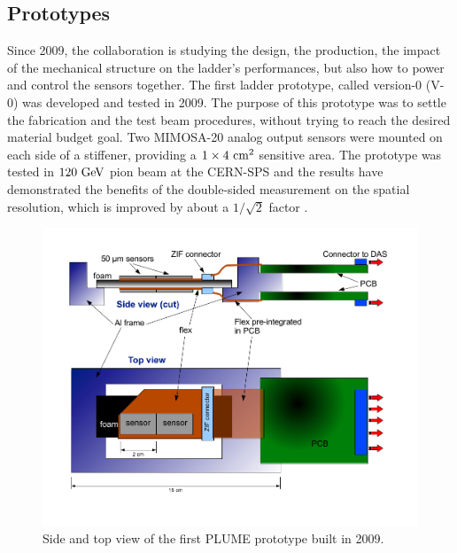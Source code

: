     \subsection{Prototypes}
    \label{sec:prototypes}

    Since 2009, the collaboration is studying the design, the production, the impact of the mechanical structure on the ladder's performances, but also how to power and control the sensors together.
    The first ladder prototype, called version-0 (V-0) was developed and tested in 2009.
    The purpose of this prototype was to settle the fabrication and the test beam procedures, without trying to reach the desired material budget goal.
    Two MIMOSA-20 analog output sensors were mounted on each side of a stiffener, providing a $1 \times 4~\rm{cm}^2$ sensitive area.
    The prototype was tested in $120~\rm{GeV}$ pion beam at the CERN-SPS and the results have demonstrated the benefits of the double-sided measurement on the spatial resolution, which is improved by about a $1/\sqrt{2}$ factor \cite{Nomerotski}.

    \begin{figure}[!h]
      \centering
      \includegraphics[width = \textwidth]{Pictures/vxd/bos_ladder_v1_PLUME0.png}
      \caption{Side and top view of the first PLUME prototype built in 2009.}
    \end{figure}

